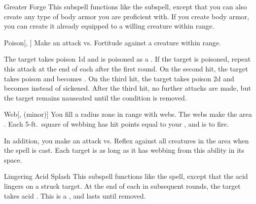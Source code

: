 \begin{ability}[\nth{2}]{Greater Forge}
This subspell functions like the  subspell, except that you can also create any type of body armor you are proficient with.
If you create body armor, you can create it already equipped to a willing creature within range.
\end{ability}
\vspace{0.25em}



\begin{ability}[\nth{2}]{Poison}[, ]
Make an attack vs. Fortitude against a creature within \rngmed range.

\hit The target takes poison  \plus1d and is poisoned as a .
If the target is poisoned, repeat this attack at the end of each  after the first round.
On the second hit, the target takes poison  and becomes .
On the third hit, the target takes poison  \plus2d and becomes  instead of sickened.
After the third hit, no further attacks are made, but the target remains nauseated until the condition is removed.
\end{ability}
\vspace{0.25em}



\begin{ability}[\nth{2}]{Web}[,  (minor)]
You fill a \areasmall radius zone in \rngclose range with webs.
The webs make the area .
Each 5-ft.\ square of webbing has hit points equal to your , and is  to fire.

In addition, you make an attack vs. Reflex against all creatures in the area when the spell is cast.
\hit Each target is \immobilized as long as it has webbing from this ability in its space.
\end{ability}
\vspace{0.25em}



\begin{ability}[\nth{3}]{Lingering Acid Splash}
This subspell functions like the  spell, except that the acid lingers on a struck target.
At the end of each  in subsequent rounds, the target takes acid .
This is a , and lasts until removed.
\end{ability}
\vspace{0.25em}




